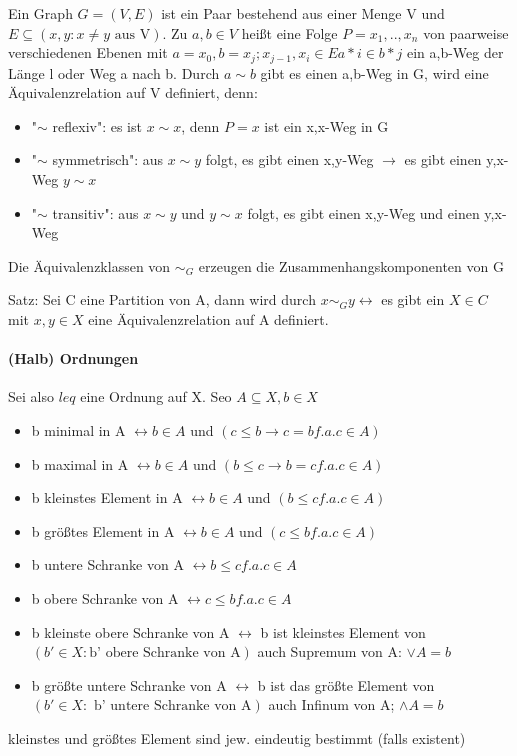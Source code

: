 \documentclass[10pt,landscape]{article}
\begin{document}
\begin{multicols}{3}
Ein Graph $G=(V,E)$ ist ein Paar bestehend aus einer Menge V und $E\subseteq (x,y: x \not = y \text{ aus V} )$.
Zu $a,b\in V$ heißt eine Folge $P=x_1,..,x_n$ von paarweise verschiedenen Ebenen mit $a=x_0, b=x_j; x_{j-1},x_i \in E{a*i \in b*j}$ ein a,b-Weg der Länge l oder Weg a nach b. Durch $a\sim b$ gibt es einen a,b-Weg in G, wird eine Äquivalenzrelation auf V definiert, denn:
\begin{itemize}
    \item "$\sim$ reflexiv": es ist $x\sim x$, denn $P=x$ ist ein x,x-Weg in G
    \item "$\sim$ symmetrisch": aus $x\sim y$ folgt, es gibt einen x,y-Weg $\rightarrow$ es gibt einen y,x-Weg $y\sim x$
    \item "$\sim$ transitiv": aus $x\sim y$ und $y\sim x$ folgt, es gibt einen x,y-Weg und einen y,x-Weg
\end{itemize}
Die Äquivalenzklassen von $\sim _G$ erzeugen die Zusammenhangskomponenten von G

Satz: Sei C eine Partition von A, dann wird durch $x\sim _G y \leftrightarrow$ es gibt ein $X\in C$ mit $x,y\in X$ eine Äquivalenzrelation auf A definiert.

\paragraph{(Halb) Ordnungen}
Sei also $leq$ eine Ordnung auf X. Seo $A\subseteq X, b\in X$
\begin{itemize}
    \item b minimal in A $\leftrightarrow b\in A$ und $(c\leq b \rightarrow c=b f.a. c\in A)$
    \item b maximal in A $\leftrightarrow b\in A$ und $(b\leq c \rightarrow b=c f.a. c\in A)$
    \item b kleinstes Element in A $\leftrightarrow b\in A$ und $(b\leq c f.a. c\in A)$
    \item b größtes Element in A $\leftrightarrow b\in A$ und $(c\leq b f.a. c\in A)$
    \item b untere Schranke von A $\leftrightarrow b\leq c f.a. c\in A$
    \item b obere Schranke von A $\leftrightarrow c\leq b f.a. c\in A$
    \item b kleinste obere Schranke von A $\leftrightarrow$ b ist kleinstes Element von $(b'\in X: \text{b' obere Schranke von A})$ auch Supremum von A: $\lor A = b$
    \item b größte untere Schranke von A $\leftrightarrow$ b ist das größte Element von $(b'\in X: \text{ b' untere Schranke von A} )$ auch Infinum von A; $\land A = b$
\end{itemize}
kleinstes und größtes Element sind jew. eindeutig bestimmt (falls existent)


\end{multicols}
\end{document}
